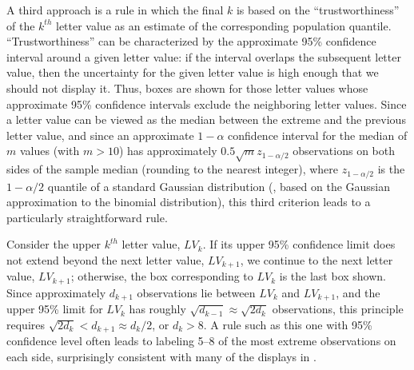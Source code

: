 \documentclass[oneside]{article}
\begin{document}
A third approach is a rule in which the final $k$ is based on the ``trustworthiness'' of the $k^{th}$ letter value as an estimate of the corresponding population quantile. ``Trustworthiness'' can be characterized by the approximate 95\% confidence interval around a given letter value: if the interval overlaps the subsequent letter value, then the uncertainty for the given letter value is high enough that we should not display it. Thus, boxes are shown for those letter values whose approximate 95\% confidence intervals exclude the neighboring letter values. Since a letter value can be viewed as the median between the extreme and the previous letter value, and since an approximate $1-\alpha$ confidence interval for the median of $m$ values (with $m > 10$) has approximately $0.5 \sqrt{m} z_{1-\alpha/2}$ observations on both sides of the sample median (rounding to the nearest integer), where $z_{1-\alpha/2}$ is the ${1-\alpha/2}$ quantile of a standard Gaussian distribution (\citet[161]{ha.order}, based on the Gaussian approximation to the binomial distribution), this third criterion leads to a particularly straightforward rule.


Consider the upper $k^{th}$ letter value, $LV_k$. If its upper 95\% confidence limit does not extend beyond the next letter value, $LV_{k+1}$, we continue to the next letter value, $LV_{k+1}$; otherwise, the box corresponding to $LV_k$ is the last box shown. Since approximately $d_{k+1}$ observations lie between $LV_k$ and $LV_{k+1}$, and the upper 95\% limit for $LV_k$ has roughly $\sqrt{d_{k-1}} \approx \sqrt{2 d_k }$ observations, this principle requires $\sqrt{2 d_k} < d_{k+1} \approx d_k / 2$, or $d_k > 8$. A rule such as this one with 95\% confidence level often leads to labeling 5--8 of the most extreme observations on each side, surprisingly consistent with many of the displays in \citet{eda}.
\end{document}
